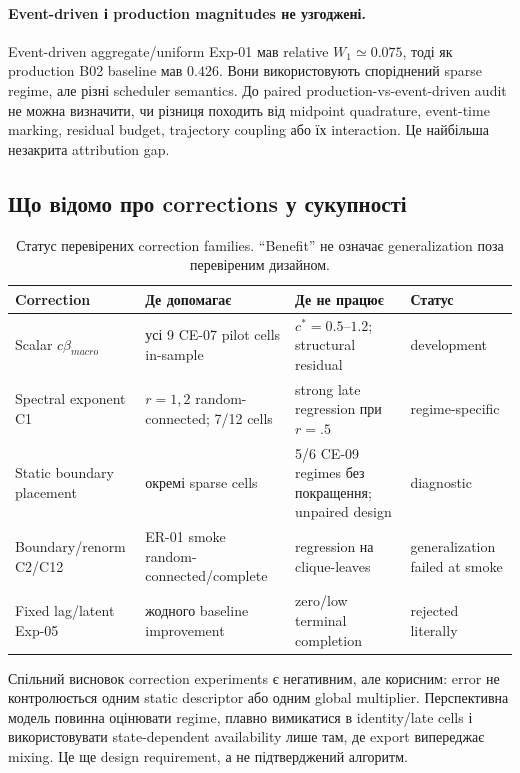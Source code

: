 \documentclass[11pt,a4paper]{article}
\begin{document}
\paragraph{Event-driven і production magnitudes не узгоджені.}
Event-driven aggregate/uniform Exp-01 мав relative $W_1\simeq0.075$, тоді як
production B02 baseline мав $0.426$. Вони використовують споріднений sparse
regime, але різні scheduler semantics. До paired production-vs-event-driven
audit не можна визначити, чи різниця походить від midpoint quadrature,
event-time marking, residual budget, trajectory coupling або їх interaction.
Це найбільша незакрита attribution gap.

\subsection{Що відомо про corrections у сукупності}

\begin{table}[H]
\centering
\caption{Статус перевірених correction families. ``Benefit'' не означає
generalization поза перевіреним дизайном.}
\begin{tabular}{p{3.2cm}p{4.0cm}p{4.0cm}p{3.2cm}}
\toprule
Correction & Де допомагає & Де не працює & Статус\\
\midrule
Scalar $c\beta_{macro}$ & усі 9 CE-07 pilot cells in-sample & $c^*=0.5$--$1.2$; structural residual & development\\
Spectral exponent C1 & $r=1,2$ random-connected; 7/12 cells & strong late regression при $r=.5$ & regime-specific\\
Static boundary placement & окремі sparse cells & 5/6 CE-09 regimes без покращення; unpaired design & diagnostic\\
Boundary/renorm C2/C12 & ER-01 smoke random-connected/complete & regression на clique-leaves & generalization failed at smoke\\
Fixed lag/latent Exp-05 & жодного baseline improvement & zero/low terminal completion & rejected literally\\
\bottomrule
\end{tabular}
\end{table}

Спільний висновок correction experiments є негативним, але корисним: error не
контролюється одним static descriptor або одним global multiplier. Перспективна
модель повинна оцінювати regime, плавно вимикатися в identity/late cells і
використовувати state-dependent availability лише там, де export випереджає
mixing. Це ще design requirement, а не підтверджений алгоритм.
\end{document}
